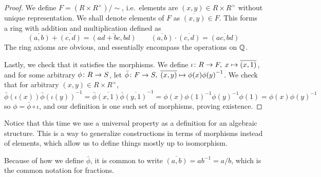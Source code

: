 \begin{proof}
    We define \(F = (R \times R^\times)/{\sim}\),
    i.e.\ elements are \((x,y) \in R \times R^\times\)
    without unique representation.
    We shall denote elements of \(F\) as \(\overline{(x,y)} \in F\).
    This forms a ring with addition and multiplication defined as
    \begin{equation*}
        \overline{(a,b)} + \overline{(c,d)} = \overline{(ad+bc,bd)} \qquad
        \overline{(a,b)} \cdot \overline{(c,d)} = \overline{(ac,bd)}
    \end{equation*}
    The ring axioms are obvious,
    and essentially encompass the operations on \(\mathbb{Q}\).

    Lastly, we check that it satisfies the morphisms.
    We define \(\iota\colon R\to F,\;x\mapsto\overline{(x,1)}\),
    and for some arbitrary \(\phi\colon R\to S\),
    let \(\bar{\phi}\colon F\to S,\;\overline{(x,y)}\mapsto\phi(x){\phi(y)}^{-1}\).
    We check that for arbitrary \((x,y) \in R \times R^\times\),
    \begin{equation*}
        \bar{\phi}(\iota(x)){\bar{\phi}(\iota(y))}^{-1}
        = \bar{\phi}\overline{(x,1)}{\bar{\phi}\overline{(y,1)}}^{-1}
        = \phi(x){\phi(1)}^{-1}{\phi(y)}^{-1}\phi(1)
        = \phi(x){\phi(y)}^{-1}
    \end{equation*}
    so \(\phi = \bar{\phi}\circ\iota\),
    and our definition is one such set of morphisms, proving existence.
\end{proof}
\begin{remark}
    Notice that this time we use a universal property
    as a definition for an algebraic structure.
    This is a way to generalize constructions
    in terms of morphisms instead of elements,
    which allow us to define things mostly up to isomorphism.
\end{remark}
\begin{remark}
    Because of how we define \(\bar{\phi}\),
    it is common to write \(\overline{(a,b)} = ab^{-1} = a/b\),
    which is the common notation for fractions.
\end{remark}


